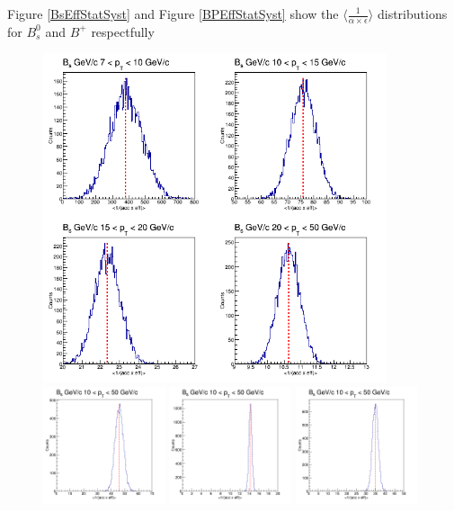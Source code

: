Figure \ref{BsEffStatSyst} and Figure \ref{BPEffStatSyst} show the $\langle\frac{1}{\alpha \times \epsilon}\rangle$ distributions for $B^0_s$ and $B^+$ respectfully

\begin{figure}[h]
\begin{center}
\includegraphics[width= 0.90\textwidth]{Figures/Chapter5/BsStatSyst_0_90_4BinsPT.png}
\includegraphics[width= 0.32\textwidth]{Figures/Chapter5/BsStatSyst_0_30_1BinsPT.png}
\includegraphics[width= 0.32\textwidth]{Figures/Chapter5/BsStatSyst_30_90_1BinsPT.png}
\includegraphics[width= 0.32\textwidth]{Figures/Chapter5/BsStatSyst_0_90_1BinsPT.png}

\end{center}
\end{figure}
